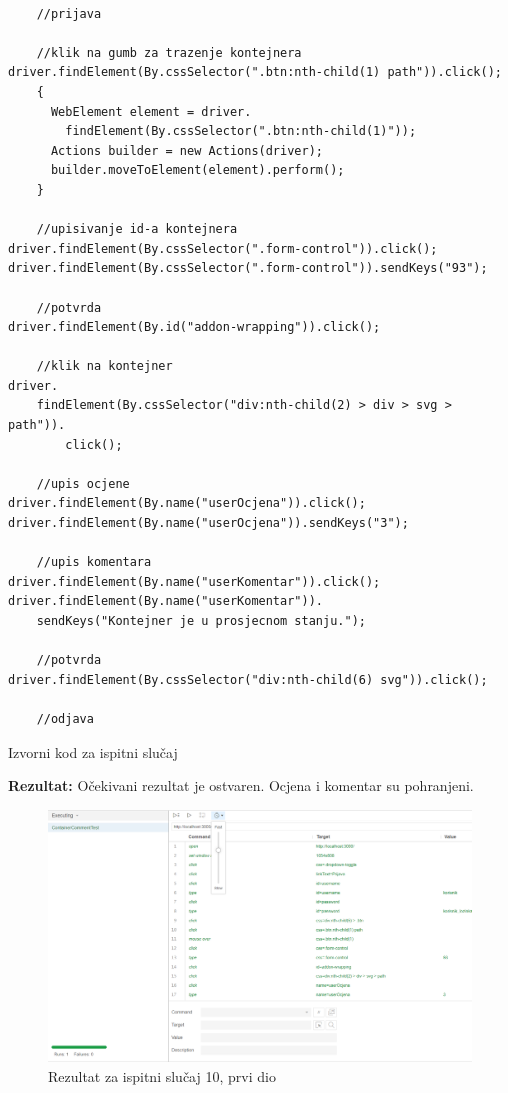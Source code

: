 \begin{lstlisting}

    //prijava

    //klik na gumb za trazenje kontejnera
driver.findElement(By.cssSelector(".btn:nth-child(1) path")).click();
    {
      WebElement element = driver.
        findElement(By.cssSelector(".btn:nth-child(1)"));
      Actions builder = new Actions(driver);
      builder.moveToElement(element).perform();
    }
    
    //upisivanje id-a kontejnera
driver.findElement(By.cssSelector(".form-control")).click();
driver.findElement(By.cssSelector(".form-control")).sendKeys("93");
    
    //potvrda
driver.findElement(By.id("addon-wrapping")).click();

    //klik na kontejner
driver.
    findElement(By.cssSelector("div:nth-child(2) > div > svg > path")).
        click();
    
    //upis ocjene
driver.findElement(By.name("userOcjena")).click();
driver.findElement(By.name("userOcjena")).sendKeys("3");

    //upis komentara
driver.findElement(By.name("userKomentar")).click();
driver.findElement(By.name("userKomentar")).
    sendKeys("Kontejner je u prosjecnom stanju.");
    
    //potvrda
driver.findElement(By.cssSelector("div:nth-child(6) svg")).click();

    //odjava
\end{lstlisting}
			\begin{listing}[H]

				\caption{Izvorni kod za ispitni slučaj \thetestcase}
				\label{test3}
			\end{listing}
			\noindent \textbf{Rezultat:} Očekivani rezultat je ostvaren. Ocjena i komentar su pohranjeni.
			
			\begin{figure}[H]
            					\includegraphics[scale=0.5]{dokumentacija/slike/selenium/containercomment.png}
            					\centering
            					\caption{Rezultat za ispitni slučaj 10, prvi dio}
            					\label{fig:test 10 p1}
            		            \end{figure}
			
